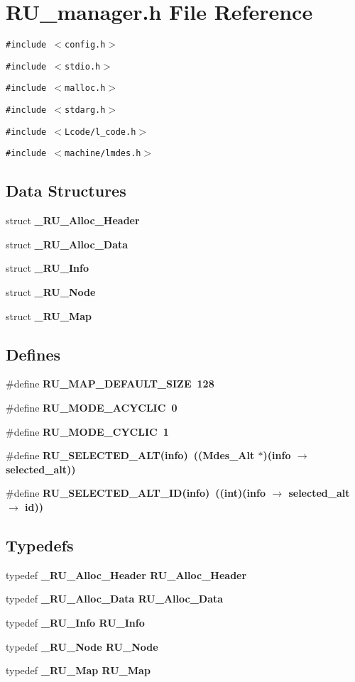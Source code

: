 \section{RU\_\-manager.h File Reference}
\label{RU__manager_8h}
{\tt \#include $<$config.h$>$}\par
{\tt \#include $<$stdio.h$>$}\par
{\tt \#include $<$malloc.h$>$}\par
{\tt \#include $<$stdarg.h$>$}\par
{\tt \#include $<$Lcode/l\_\-code.h$>$}\par
{\tt \#include $<$machine/lmdes.h$>$}\par
\subsection*{Data Structures}
\begin{CompactItemize}
\item 
struct \bf{\_\-RU\_\-Alloc\_\-Header}
\item 
struct \bf{\_\-RU\_\-Alloc\_\-Data}
\item 
struct \bf{\_\-RU\_\-Info}
\item 
struct \bf{\_\-RU\_\-Node}
\item 
struct \bf{\_\-RU\_\-Map}
\end{CompactItemize}
\subsection*{Defines}
\begin{CompactItemize}
\item 
\#define \bf{RU\_\-MAP\_\-DEFAULT\_\-SIZE}~128
\item 
\#define \bf{RU\_\-MODE\_\-ACYCLIC}~0
\item 
\#define \bf{RU\_\-MODE\_\-CYCLIC}~1
\item 
\#define \bf{RU\_\-SELECTED\_\-ALT}(info)~((Mdes\_\-Alt $\ast$)(info $\rightarrow$ selected\_\-alt))
\item 
\#define \bf{RU\_\-SELECTED\_\-ALT\_\-ID}(info)~((int)(info $\rightarrow$ selected\_\-alt $\rightarrow$ id))
\end{CompactItemize}
\subsection*{Typedefs}
\begin{CompactItemize}
\item 
typedef \bf{\_\-RU\_\-Alloc\_\-Header} \bf{RU\_\-Alloc\_\-Header}
\item 
typedef \bf{\_\-RU\_\-Alloc\_\-Data} \bf{RU\_\-Alloc\_\-Data}
\item 
typedef \bf{\_\-RU\_\-Info} \bf{RU\_\-Info}
\item 
typedef \bf{\_\-RU\_\-Node} \bf{RU\_\-Node}
\item 
typedef \bf{\_\-RU\_\-Map} \bf{RU\_\-Map}
\end{CompactItemize}
